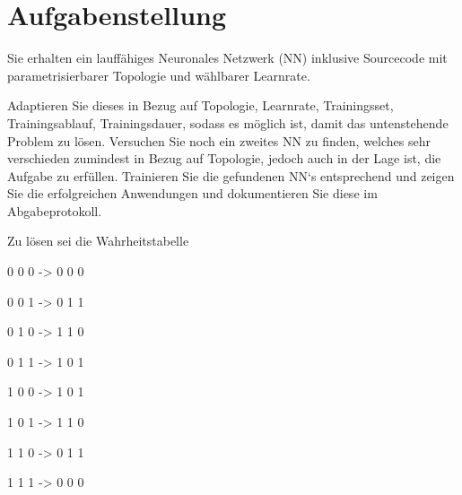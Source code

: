 \section{Aufgabenstellung}
Sie erhalten ein lauffähiges Neuronales Netzwerk (NN) inklusive Sourcecode mit parametrisierbarer Topologie und wählbarer Learnrate.

Adaptieren Sie dieses in Bezug auf Topologie, Learnrate, Trainingsset, Trainingsablauf, Trainingsdauer, sodass es möglich ist, damit das untenstehende Problem zu lösen. Versuchen Sie noch ein zweites NN zu finden, welches sehr verschieden zumindest in Bezug auf Topologie, jedoch auch in der Lage ist, die Aufgabe zu erfüllen. Trainieren Sie die gefundenen NN‘s entsprechend und zeigen Sie die erfolgreichen Anwendungen und dokumentieren Sie diese im Abgabeprotokoll.

Zu lösen sei die Wahrheitstabelle

0 0 0 -> 0 0 0

0 0 1 -> 0 1 1

0 1 0 -> 1 1 0

0 1 1 -> 1 0 1

1 0 0 -> 1 0 1

1 0 1 -> 1 1 0

1 1 0 -> 0 1 1

1 1 1 -> 0 0 0
\clearpage
